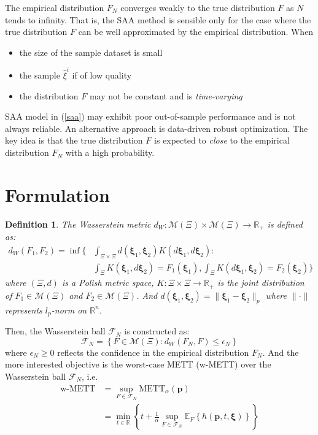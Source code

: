 \documentclass{article}
\newtheorem{defin}{Definition}
\begin{document}
The empirical distribution $F_N$ converges weakly to the true distribution $F$ as $N$ tends to infinity. That is, the SAA method is sensible only for the case where the true distribution $F$ can be well approximated by the empirical distribution. When
\begin{itemize}
	\item the size of the sample dataset is small
	\item the sample $\hat{\xi}^i$ if of low quality
	\item the distribution $F$ may not be constant and is \textit{time-varying}
\end{itemize}
SAA model in (\ref{saa}) may exhibit poor out-of-sample performance and is not always reliable. An alternative approach is data-driven robust optimization. The key idea is that the true distribution $F$ is expected to \textit{close} to the empirical distribution $F_N$ with a high probability.

\section{Formulation}

\begin{defin}
	The Wasserstein metric $d_W:\mathcal{M}(\Xi) \times \mathcal{M}(\Xi) \rightarrow \mathbb{R}_+$ is defined as:
	\begin{align}
		d_W(F_1, F_2)  = \inf \Bigg\{ &	\int_{\Xi \times \Xi} d(\bm{\xi}_1, \bm{\xi}_2) K(d \bm{\xi}_1, d\bm{\xi}_2) : \\
		& \int_{\Xi} K(\bm{\xi}_1, d\bm{\xi}_2) = F_1(\bm{\xi}_1), \int_{\Xi} K(d\bm{\xi}_1, \bm{\xi}_2) = F_2(\bm{\xi}_2)  \Bigg\}
	\end{align}
	where $(\Xi, d)$ is a Polish metric space, $K: \Xi \times \Xi \rightarrow \mathbb{R}_+$ is the joint distribution of $F_1 \in \mathcal{M}(\Xi)$ and $F_2 \in \mathcal{M}(\Xi)$. And $d(\bm{\xi}_1, \bm{\xi}_2) = \|\bm{\xi}_1 - \bm{\xi}_2\|_p$ where $\| \cdot \|$ represents $l_p$-norm on $\mathbb{R}^n$.
\end{defin}

Then, the Wasserstein ball $\mathcal{F}_N$ is constructed as:
\begin{equation}
	\mathcal{F}_N = \left\{F \in \mathcal{M}(\Xi) : d_W(F_N, F)\leq \epsilon_N \right\}
\end{equation}
where $\epsilon_N \geq 0$ reflects the confidence in the empirical distribution $F_N$. And the more interested objective is the worst-case METT (w-METT) over the Wasserstein ball $\mathcal{F}_N$, i.e.
\begin{align}
	\text{w-METT} & = \sup_{F \in \mathcal{F}_N} \text{METT}_\alpha (\bm{p}) \\
	& = \min_{t \in \mathbb{R}} \left\{t + \frac{1}{\alpha} \sup_{F \in \mathcal{F}_N} \mathbb{E}_{F}\left\{h(\bm{p}, t, \bm{\xi})\right\}\right\}
\end{align}
\end{document}
